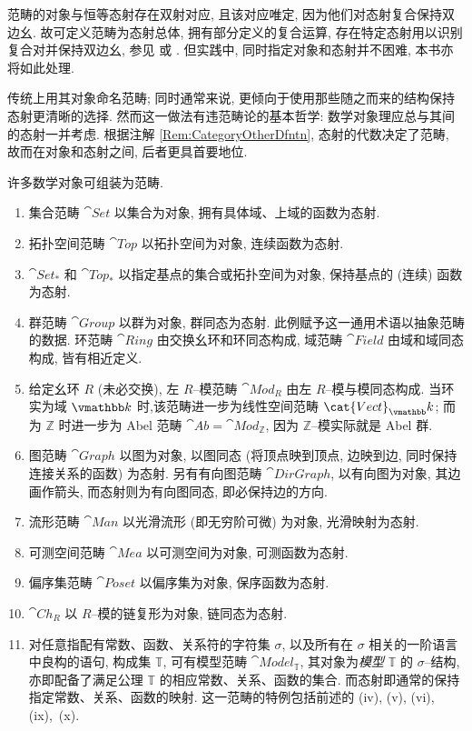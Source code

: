 \begin{remark}\label{Rem:CategoryOtherDfntn}
    范畴的对象与恒等态射存在双射对应, 且该对应唯定, 因为他们对态射复合保持双边幺. 故可定义范畴为态射总体, 拥有部分定义的复合运算, 存在特定态射用以识别复合对并保持双边幺, 参见 \cite{Ehr65} 或 \cite{FS90}. 但实践中, 同时指定对象和态射并不困难, 本书亦将如此处理.
\end{remark}
\par 传统上用其对象命名范畴; 同时通常来说, 更倾向于使用那些随之而来的结构保持态射更清晰的选择. 然而这一做法有违范畴论的基本哲学: 数学对象理应总与其间的态射一并考虑. 根据注解 \ref{Rem:CategoryOtherDfntn}, 态射的代数决定了范畴, 故而在对象和态射之间, 后者更具首要地位.

\begin{example}\label{Expl:Concrete.Category}
    许多数学对象可组装为范畴.
    \begin{enumerate}[label={(\roman*)}, ref = {(\roman*)}]
        \item 集合范畴 \(\cat{Set}\) 以集合为对象, 拥有具体域、上域的函数为态射.
        \item 拓扑空间范畴 \(\cat{Top}\) 以拓扑空间为对象, 连续函数为态射.
        \item \(\cat{Set}_*\) 和 \(\cat{Top}_*\) 以指定基点的集合或拓扑空间为对象, 保持基点的 (连续) 函数为态射.
        \item 群范畴 \(\cat{Group}\) 以群为对象, 群同态为态射. 此例赋予这一通用术语以抽象范畴的数据. 环范畴 \(\cat{Ring}\) 由交换幺环和环同态构成, 域范畴 \(\cat{Field}\) 由域和域同态构成, 皆有相近定义.
        \item 给定幺环 \(R\) (未必交换), 左 \(R\)--模范畴 \(\cat{Mod}_R\) 由左 \(R\)--模与模同态构成. 当环实为域 \(\vmathbb k\) 时,该范畴进一步为线性空间范畴 \(\cat{Vect}_\vmathbb k\); 而为 \(\mathbb Z\) 时进一步为 Abel 范畴 \(\cat{Ab} =\cat{Mod}_\mathbb Z\), 因为 \(\mathbb Z\)--模实际就是 Abel 群.
        \item 图范畴 \(\cat{Graph}\) 以图为对象, 以图同态 (将顶点映到顶点, 边映到边, 同时保持连接关系的函数) 为态射. 另有有向图范畴 \(\cat{DirGraph}\), 以有向图为对象, 其边画作箭头, 而态射则为有向图同态, 即必保持边的方向.
        \item 流形范畴 \(\cat{Man}\) 以光滑流形 (即无穷阶可微) 为对象, 光滑映射为态射.
        \item 可测空间范畴 \(\cat{Mea}\) 以可测空间为对象, 可测函数为态射.
        \item 偏序集范畴 \(\cat{Poset}\) 以偏序集为对象, 保序函数为态射.
        \item \(\cat{Ch}_R\) 以 \(R\)--模的链复形为对象, 链同态为态射.
        \item 对任意指配有常数、函数、关系符的字符集 \(\sigma\), 以及所有在 \(\sigma\) 相关的一阶语言中良构的语句, 构成集 \(\mathbb T\), 可有模型范畴 \(\cat{Model}_\mathbb T\), 其对象为\textit{模型} \(\mathbb T\) 的 \(\sigma\)--结构, 亦即配备了满足公理 \(\mathbb T\) 的相应常数、关系、函数的集合. 而态射即通常的保持指定常数、关系、函数的映射. 这一范畴的特例包括前述的 (iv), (v), (vi), (ix),~(x).
    \end{enumerate}
\end{example}
